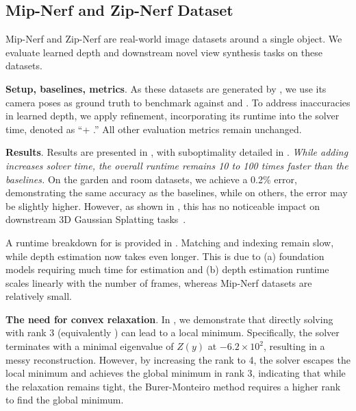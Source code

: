 \subsection{Mip-Nerf and Zip-Nerf Dataset}\label{sec:exp-mipnerf}



Mip-Nerf and Zip-Nerf \cite{barron2022mipnerf360,barron2023zipnerf} are real-world image datasets around a single object. We evaluate learned depth and downstream novel view synthesis tasks on these datasets.

\textbf{Setup, baselines, metrics}.
As these datasets are generated by \colmap, we use its camera poses as ground truth to benchmark \nameshort against \colmap and \glomap. To address inaccuracies in learned depth, we apply \ceres refinement, incorporating its runtime into the solver time, denoted as ``\nameshort + \ceres.'' All other evaluation metrics remain unchanged.

\textbf{Results}.
Results are presented in , with suboptimality detailed in . \emph{While adding \ceres increases solver time, the overall runtime remains 10 to 100 times faster than the baselines.} On the garden and room datasets, we achieve a 0.2\% error, demonstrating the same accuracy as the baselines, while on others, the error may be slightly higher. However, as shown in , this has no noticeable impact on downstream 3D Gaussian Splatting tasks~\cite{kerbl3Dgaussians}.

A runtime breakdown for \nameshort is provided in . Matching and indexing remain slow, while depth estimation now takes even longer. This is due to (a) foundation models requiring much time for estimation and (b) depth estimation runtime scales linearly with the number of frames, whereas Mip-Nerf datasets are relatively small.  

\textbf{The need for convex relaxation}. 
In , we demonstrate that directly solving  with rank 3 (equivalently ) can lead to a local minimum. Specifically, the solver terminates with a minimal eigenvalue of $Z(y)$ at $-6.2 \times 10^{2}$, resulting in a messy reconstruction. However, by increasing the rank to 4, the solver escapes the local minimum and achieves the global minimum in rank 3, indicating that while the relaxation remains tight, the Burer-Monteiro method requires a higher rank to find the global minimum. 

